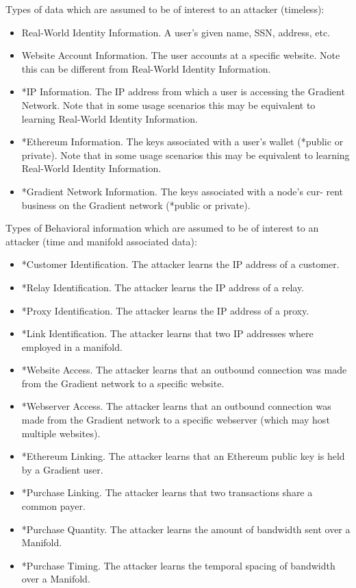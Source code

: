 \documentclass{article}
\begin{document}
Types of data which are assumed to be of interest to an attacker (timeless):

\begin{itemize}
    \item Real-World Identity Information. A user’s given name, SSN, address, etc.
    \item Website Account Information. The user accounts at a specific website. Note this can be different from Real-World Identity Information.
    \item *IP Information. The IP address from which a user is accessing the Gradient Network. Note that in some usage scenarios this may be equivalent to learning Real-World Identity Information.
    \item *Ethereum Information. The keys associated with a user’s wallet (*public or private). Note that in some usage scenarios this may be equivalent to learning Real-World Identity Information.
    \item *Gradient Network Information. The keys associated with a node’s cur- rent business on the Gradient network (*public or private).
\end{itemize}

Types of Behavioral information which are assumed to be of interest to an attacker (time and manifold associated data):

\begin{itemize}
    \item *Customer Identification. The attacker learns the IP address of a customer.
    \item *Relay Identification. The attacker learns the IP address of a relay.
    \item *Proxy Identification. The attacker learns the IP address of a proxy.
    \item *Link Identification. The attacker learns that two IP addresses where employed in a manifold.
    \item *Website Access. The attacker learns that an outbound connection was made from the Gradient network to a specific website.
    \item *Webserver Access. The attacker learns that an outbound connection was made from the Gradient network to a specific webserver (which may host multiple websites).
    \item *Ethereum Linking. The attacker learns that an Ethereum public key is held by a Gradient user.
    \item *Purchase Linking. The attacker learns that two transactions share a common payer.
    \item *Purchase Quantity. The attacker learns the amount of bandwidth sent over a Manifold.
    \item *Purchase Timing. The attacker learns the temporal spacing of bandwidth over a Manifold.
\end{itemize}
\end{document}
